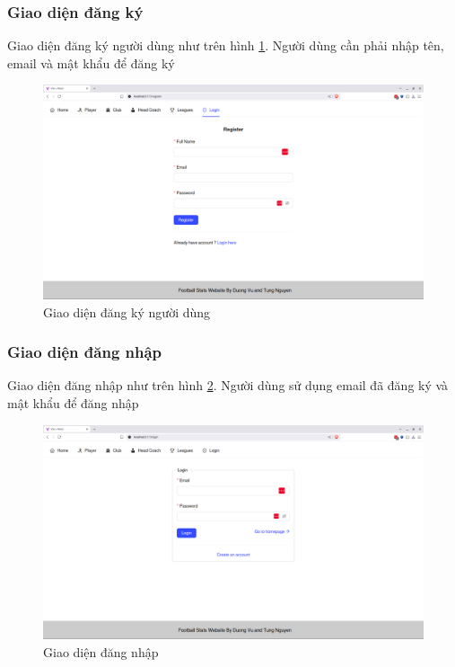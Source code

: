 \documentclass[../BTL.tex]{subfiles}
\begin{document}
\subsubsection{Giao diện đăng ký}
Giao diện đăng ký người dùng như trên hình \ref{fig:user-register}.  Người dùng cần phải nhập tên, email và mật khẩu để đăng ký
\begin{figure}
\centering
\includegraphics[width=1\linewidth]{Hinhve/user-register.png}
\caption{Giao diện đăng ký người dùng}
\label{fig:user-register}
\end{figure}

\subsubsection{Giao diện đăng nhập}
Giao diện đăng nhập như trên hình \ref{fig:user-login}. Người dùng sử dụng email đã đăng ký và mật khẩu để đăng nhập
\begin{figure}
\centering
\includegraphics[width=1\linewidth]{Hinhve/user-login.png}
\caption{Giao diện đăng nhập}
\label{fig:user-login}
\end{figure}
\end{document}
